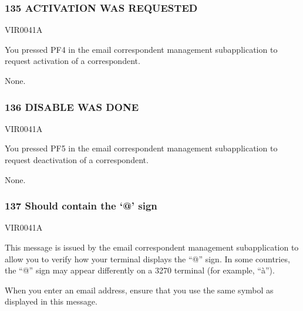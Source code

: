 \documentclass[letterpaper,10pt,english]{sphinxmanual}
\begin{document}
\subsubsection{135 ACTIVATION WAS REQUESTED}
\label{\detokenize{messages:activation-was-requested}}\begin{description}
\sphinxAtStartPar
VIR0041A

\sphinxAtStartPar
You pressed PF4 in the e\sphinxhyphen{}mail correspondent management sub\sphinxhyphen{}application to request activation of a correspondent.

\sphinxAtStartPar
None.

\end{description}


\subsubsection{136 DISABLE WAS DONE}
\label{\detokenize{messages:disable-was-done}}\begin{description}
\sphinxAtStartPar
VIR0041A

\sphinxAtStartPar
You pressed PF5 in the e\sphinxhyphen{}mail correspondent management sub\sphinxhyphen{}application to request deactivation of a correspondent.

\sphinxAtStartPar
None.

\end{description}


\subsubsection{137 Should contain the ‘@’ sign}
\label{\detokenize{messages:should-contain-the-sign}}\begin{description}
\sphinxAtStartPar
VIR0041A

\sphinxAtStartPar
This message is issued by the e\sphinxhyphen{}mail correspondent management sub\sphinxhyphen{}application to allow you to verify how your terminal displays the “@” sign. In some countries, the “@” sign may appear differently on a 3270 terminal (for example, “à”).

\sphinxAtStartPar
When you enter an e\sphinxhyphen{}mail address, ensure that you use the same symbol as displayed in this message.

\end{description}
\end{document}
